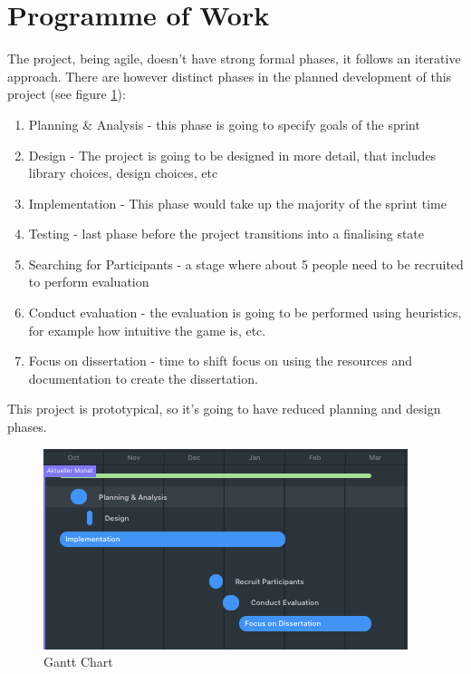 \section{Programme of Work}
The project, being agile, doesn't have strong formal phases, it follows an iterative approach. 
There are however distinct phases in the planned development of this project (see figure \ref{fig:gantt}):

\begin{enumerate}
    \item Planning \& Analysis - this phase is going to specify goals of the sprint
    \item Design - The project is going to be designed in more detail, that includes library choices, design choices, etc
    \item Implementation - This phase would take up the majority of the sprint time
    \item Testing - last phase before the project transitions into a finalising state
    \item Searching for Participants - a stage where about 5 people need to be recruited to perform evaluation
    \item Conduct evaluation - the evaluation is going to be performed using heuristics, for example how intuitive the game is, etc. 
    \item Focus on dissertation - time to shift focus on using the resources and documentation to create the dissertation.
\end{enumerate}
This project is prototypical, so it's going to have reduced planning and design phases. 
\begin{figure}
    \centering
    \includegraphics[width=1\linewidth]{original_proposal/Screenshot 2023-10-26 at 18.26.29.png}
    \caption{Gantt Chart}
    \label{fig:gantt}
\end{figure}
